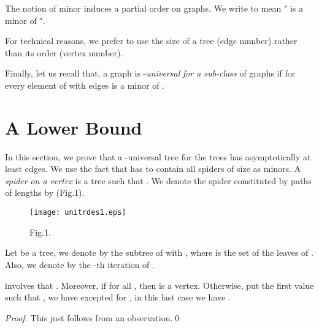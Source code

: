 \documentclass{llncs}
\begin{document}
The notion of minor induces a partial order on graphs. We write
 to mean " is a minor of ".





For technical reasons, we prefer to use the size of a tree (edge number)
rather than its order (vertex number).

Finally, let us recall that, a graph  is -\textit{universal} \textit{for a sub-class } of graphs if for
every element  of  with  edges is a minor of .





\section{A Lower Bound}





In this section, we prove that a -universal tree  for
the trees has asymptotically at least  edges. We use the
fact that  has to contain all spiders of size  as
minors. A \textit{spider }\textit{ on a vertex } is a tree
such that . We denote the spider constituted by paths
of lengths  by 
(Fig.1).


\begin{figure}[htbp]
\centerline{\texttt{[image: unitrdes1.eps]}}
\label{fig1}
\begin{center}
Fig.1. 
\end{center}
\end{figure}


\begin{definition} Let  be a tree, we denote by  the subtree of  with ,
where  is the set of the leaves of . Also, we denote by
 the -th iteration of .
\end{definition}




\begin{lemma}\label{lm1}  involves that .
 Moreover, if for all ,
 then  is a vertex.
Otherwise, put  the first value such that , we have
 excepted for
, in this last case we have .
\end{lemma}




\begin{proof} This just follows from an observation.\qed
\end{proof}
\end{document}
